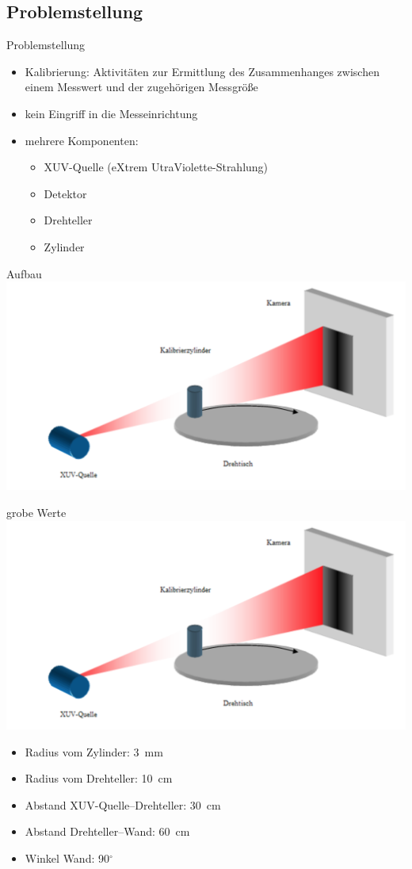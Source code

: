 \documentclass[compress]{beamer}
\begin{document}
\subsection{Problemstellung}
\begin{frame}{Problemstellung}
		\begin{itemize}
			\item Kalibrierung: Aktivitäten zur Ermittlung des Zusammenhanges zwischen einem Messwert und der zugehörigen Messgröße
			\item kein Eingriff in die Messeinrichtung
			\item mehrere Komponenten:
			\begin{itemize}
				\item XUV-Quelle (eXtrem UtraViolette-Strahlung)
				\item Detektor
				\item Drehteller
				\item Zylinder
			\end{itemize}
		\end{itemize}
\end{frame}

\begin{frame}{Aufbau}
	\centering
	\includegraphics[width=\linewidth]{images/aufbau.png}
\end{frame}

\begin{frame}{grobe Werte}
	\centering
	\includegraphics[width=0.5\linewidth]{images/aufbau.png}
	\begin{itemize}
		\item Radius vom Zylinder: 3~mm
		\item Radius vom Drehteller: 10~cm
		\item Abstand XUV-Quelle--Drehteller: 30~cm
		\item Abstand Drehteller--Wand: 60~cm
		\item Winkel Wand: 90$^\circ$
	\end{itemize}
\end{frame}
\end{document}
